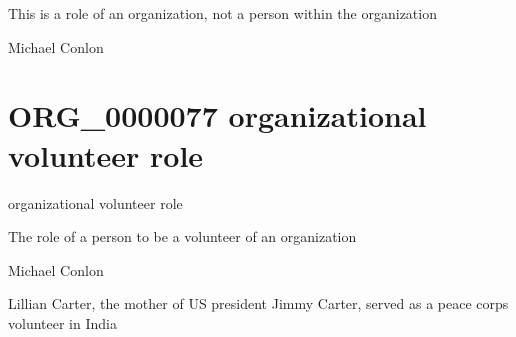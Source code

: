 \documentclass[letterpaper,10pt,english]{sphinxmanual}
\begin{document}
\begin{sphinxShadowBox}

\sphinxAtStartPar
This is a role of an organization, not a person within the organization
\end{sphinxShadowBox}

\begin{sphinxShadowBox}

\sphinxAtStartPar
Michael Conlon 
\end{sphinxShadowBox}
\begin{quote}
\label{\detokenize{doc-ORG_0000077:org-0000077}}\label{\detokenize{doc-ORG_0000077:organizational-volunteer-role}}\label{\detokenize{doc-ORG_0000077:org-0000077}}
\ignorespaces \end{quote}


\section{ORG\_0000077 \sphinxhyphen{} organizational volunteer role}
\label{\detokenize{doc-ORG_0000077:org-0000077-organizational-volunteer-role}}\label{\detokenize{doc-ORG_0000077:index-0}}\label{\detokenize{doc-ORG_0000077::doc}}
\begin{sphinxShadowBox}

\sphinxAtStartPar
organizational volunteer role
\end{sphinxShadowBox}

\begin{sphinxShadowBox}

\sphinxAtStartPar
The role of a person to be a volunteer of an organization
\end{sphinxShadowBox}

\begin{sphinxShadowBox}

\sphinxAtStartPar
Michael Conlon 
\end{sphinxShadowBox}

\begin{sphinxShadowBox}

\sphinxAtStartPar
Lillian Carter, the mother of US president Jimmy Carter, served as a peace corps volunteer in India
\end{sphinxShadowBox}
\end{document}
